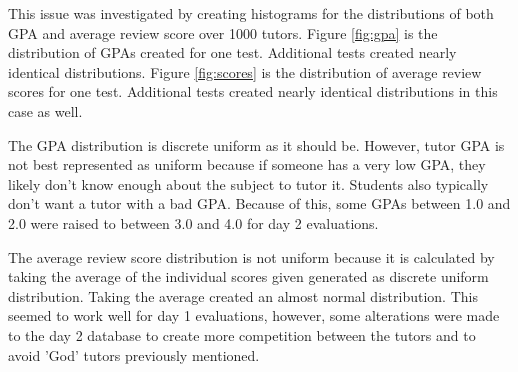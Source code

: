 This issue was investigated by creating histograms for the distributions
of both GPA and average review score over 1000 tutors. Figure \ref{fig:gpa} 
is the distribution of GPAs created for one test. Additional tests created nearly
identical distributions. Figure \ref{fig:scores} is the distribution of average
review scores for one test. Additional tests created nearly identical distributions
in this case as well. 

The GPA distribution is discrete uniform as it should be. However, tutor GPA is not
best represented as uniform because if someone has a very low GPA, they
likely don't know enough about the subject to tutor it. Students also typically don't
want a tutor with a bad GPA. Because of this, some GPAs between 1.0 and 2.0 were 
raised to between 3.0 and 4.0 for day 2 evaluations. 

The average review score distribution is not uniform because it is calculated by
taking the average of the individual scores given generated as discrete uniform 
distribution. Taking the average created an almost normal distribution. This seemed
to work well for day 1 evaluations, however, some alterations were made to the day 2
database to create more competition between the tutors and to avoid 'God' tutors previously
mentioned. 






